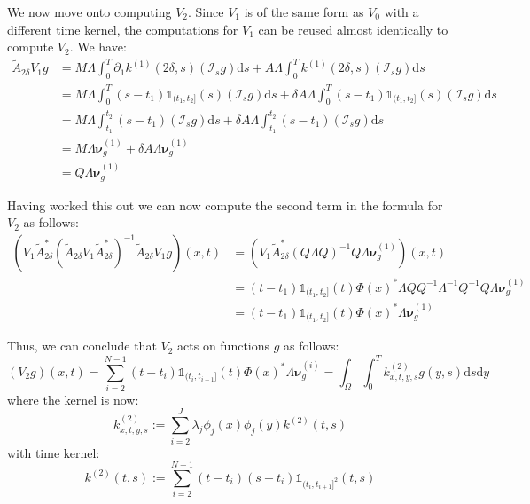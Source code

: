 \documentclass{article}
\theoremstyle{definition}
\theoremstyle{remark}
\theoremstyle{remark}
\begin{document}
\noindent We now move onto computing $V_2$. Since $V_1$ is of the same form as $V_0$ with a different time kernel, the computations for $V_1$ can be reused almost identically to compute $V_2$. We have:
\begin{align*}
    \tilde{A}_{2\delta}V_{1}g &= M\Lambda\int_{0}^{T}\partial_{1}k^{(1)}(2\delta,s)(\mathcal{I}_{s}g)\mathrm{d}s + A\Lambda\int_{0}^{T}k^{(1)}(2\delta,s)(\mathcal{I}_{s}g)\mathrm{d}s \\
    &= M\Lambda\int_{0}^{T}(s-t_1)\mathbb{1}_{(t_1,t_2]}(s)(\mathcal{I}_{s}g)\mathrm{d}s + \delta A\Lambda\int_{0}^{T}(s-t_1)\mathbb{1}_{(t_1,t_2]}(s)(\mathcal{I}_{s}g)\mathrm{d}s \\
    &= M\Lambda\int_{t_1}^{t_2}(s-t_1)(\mathcal{I}_{s}g)\mathrm{d}s + \delta A\Lambda\int_{t_1}^{t_2}(s-t_1)(\mathcal{I}_{s}g)\mathrm{d}s \\
    &= M\Lambda\boldsymbol{\nu}_{g}^{(1)}+\delta A\Lambda\boldsymbol{\nu}_{g}^{(1)} \\
    &= Q\Lambda\boldsymbol{\nu}_{g}^{(1)}
\end{align*}

\noindent Having worked this out we can now compute the second term in the formula for $V_2$ as follows:
\begin{align*}
    (V_{1}\tilde{A}_{2\delta}^{*}(\tilde{A}_{2\delta}V_{1}\tilde{A}_{2\delta}^{*})^{-1}\tilde{A}_{2\delta}V_{1}g)(x,t) &=
    (V_{1}\tilde{A}_{2\delta}^{*}(Q\Lambda Q)^{-1}Q\Lambda\boldsymbol{\nu}_{g}^{(1)})(x,t) \\
    &=(t-t_1)\mathbb{1}_{(t_1,t_2]}(t)\Phi(x)^{*}\Lambda Q Q^{-1}\Lambda^{-1}Q^{-1}Q\Lambda\boldsymbol{\nu}_{g}^{(1)} \\
    &=(t-t_1)\mathbb{1}_{(t_1,t_2]}(t)\Phi(x)^{*}\Lambda\boldsymbol{\nu}_{g}^{(1)}
\end{align*}

\noindent Thus, we can conclude that $V_2$ acts on functions $g$ as follows:
\begin{equation}
    (V_{2}g)(x,t) = \sum_{i=2}^{N-1}(t-t_i)\mathbb{1}_{(t_i,t_{i+1}]}(t)\Phi(x)^{*}\Lambda\boldsymbol{\nu}_{g}^{(i)} = \int_{\Omega}\int_{0}^{T}k^{(2)}_{x,t,y,s}g(y,s)\mathrm{d}s\mathrm{d}y
\end{equation}
where the kernel is now:
\begin{equation}
  k_{x,t,y,s}^{(2)}:=\sum_{i=2}^{J}\lambda_{j}\phi_{j}(x)\phi_{j}(y)k^{(2)}(t,s)
\end{equation}
with time kernel:
\begin{equation}
  k^{(2)}(t,s):=\sum_{i=2}^{N-1}(t-t_{i})(s-t_{i})\mathbb{1}_{(t_{i},t_{i+1}]^{2}}(t,s)
\end{equation}
\end{document}
